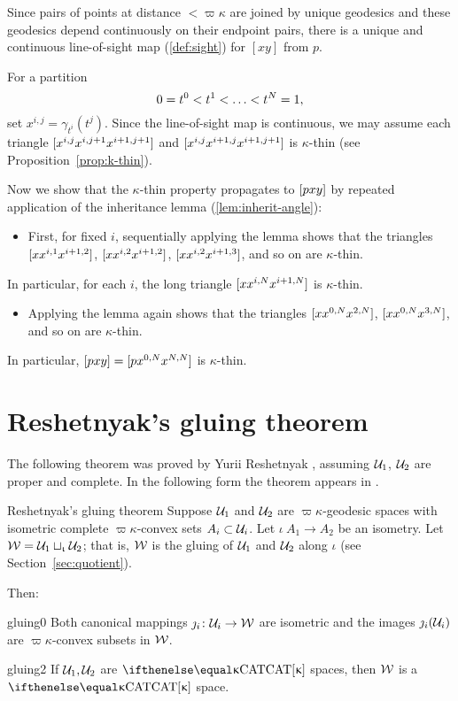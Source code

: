 Since pairs of points at distance $<\varpi\kappa$ are joined by unique geodesics and these geodesics depend continuously on their endpoint pairs, there is a unique and continuous line-of-sight map (\ref{def:sight}) for  $[x y]$ from $p$.    

For a partition \[0\z=t^0\z<t^1\z<\z\dots\z<t^N=1,\] 
set $x^{i,j}=\gamma_{t^i}(t^j)$. 
Since the line-of-sight map is continuous, we may assume each triangle $[{x^{i,j}}{x^{i,j+1}}{x^{i+1,j+1}}]$ and $[{x^{i,j}}{x^{i+1,j}}{x^{i+1,j+1}}]$ is $\kappa$-thin 
(see Proposition~\ref{prop:k-thin}).

Now we show that the $\kappa$-thin property propagates to $[{p}{x}{y}]$ by repeated application of the inheritance lemma (\ref{lem:inherit-angle}):
\begin{itemize}
\item 
First, for fixed $i$, 
sequentially applying the lemma shows  that the triangles 
$[{x}{x^{i,1}}{x^{i+1,2}}]$, 
$[{x}{x^{i,2}}{x^{i+1,2}}]$, 
$[{x}{x^{i,2}}{x^{i+1,3}}]$,
and so on are $\kappa$-thin. 
\end{itemize}
In particular, for each $i$, the long triangle $[{x}{x^{i,N}}{x^{i+1,N}}]$ is $\kappa$-thin.
\begin{itemize} 
\item 
Applying the lemma again shows that the  triangles $[{x}{x^{0,N}}{x^{2,N}}]$, $[{x}{x^{0,N}}{x^{3,N}}]$, and so on are $\kappa$-thin. 
\end{itemize}
In particular, $[{p}{x}{y}]=[{p}{x^{0,N}}{x^{N,N}}]$ is $\kappa$-thin.
\qeds

\section{Reshetnyak's gluing theorem}\label{sec:cba-gluing}

The following theorem was proved by Yurii Reshetnyak \cite{reshetnyak:glue}, assuming $\mathcal{U}_1$, $\mathcal{U}_2$ are proper and complete.  In the following form the theorem appears in \cite{BH}.

\begin{thm}{Reshetnyak's gluing theorem}\label{thm:gluing}
Suppose 
$\mathcal{U}_1$ and $\mathcal{U}_2$ are %
$\varpi\kappa$-geodesic spaces 
with isometric complete $\varpi\kappa$-convex sets $A_i\subset\spc{U}_i$.  Let $\iota\:A_1\to A_2$ be an isometry.
Let $\mathcal{W}=\mathcal{U}_1\sqcup_{\upiota}\mathcal{U}_2$;
that is, $\mathcal{W}$ is the gluing of $\mathcal{U}_1$ and  $\mathcal{U}_2$ along $\iota$ (see Section~\ref{sec:quotient}).

Then: 
\begin{subthm}{gluing0}
Both canonical mappings $\jmath_i\:\spc{U}_i\to\spc{W}$ are isometric 
and the images $\jmath_i(\mathcal{U}_i)$ are $\varpi\kappa$-convex subsets in $\mathcal{W}$.
\end{subthm}

\begin{subthm}{gluing2}
If $\mathcal{U}_1, \mathcal{U}_2$ are $\CAT\kappa$ spaces,
then $\mathcal{W}$ is a $\CAT\kappa$ space.
\end{subthm} 
\end{thm}

